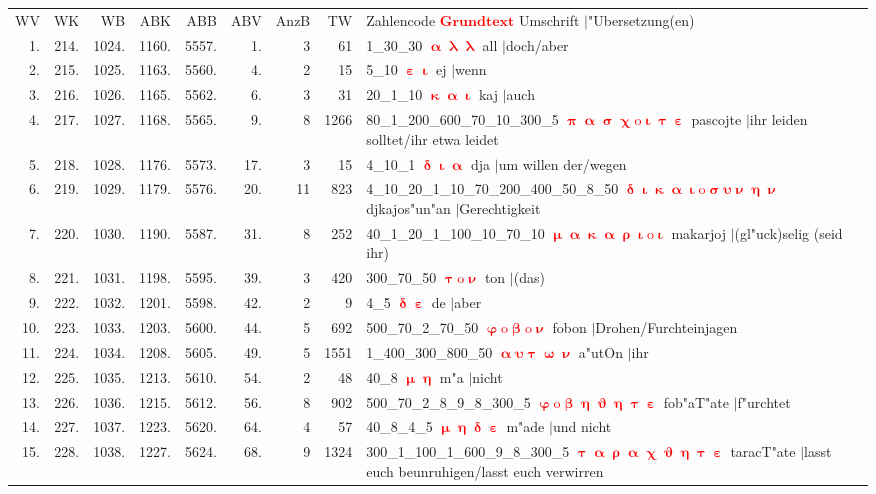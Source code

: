 \documentclass[a4paper,10pt,landscape]{article}
\begin{document}
\begin{tabular}{rrrrrrrrp{120mm}}
WV&WK&WB&ABK&ABB&ABV&AnzB&TW&Zahlencode \textcolor{red}{$\boldsymbol{Grundtext}$} Umschrift $|$"Ubersetzung(en)\\
1.&214.&1024.&1160.&5557.&1.&3&61&1\_30\_30 \textcolor{red}{$\boldsymbol{\upalpha\uplambda\uplambda}$} all $|$doch/aber\\
2.&215.&1025.&1163.&5560.&4.&2&15&5\_10 \textcolor{red}{$\boldsymbol{\upepsilon\upiota}$} ej $|$wenn\\
3.&216.&1026.&1165.&5562.&6.&3&31&20\_1\_10 \textcolor{red}{$\boldsymbol{\upkappa\upalpha\upiota}$} kaj $|$auch\\
4.&217.&1027.&1168.&5565.&9.&8&1266&80\_1\_200\_600\_70\_10\_300\_5 \textcolor{red}{$\boldsymbol{\uppi\upalpha\upsigma\upchi\mathrm{o}\upiota\uptau\upepsilon}$} pascojte $|$ihr leiden solltet/ihr etwa leidet\\
5.&218.&1028.&1176.&5573.&17.&3&15&4\_10\_1 \textcolor{red}{$\boldsymbol{\updelta\upiota\upalpha}$} dja $|$um willen der/wegen\\
6.&219.&1029.&1179.&5576.&20.&11&823&4\_10\_20\_1\_10\_70\_200\_400\_50\_8\_50 \textcolor{red}{$\boldsymbol{\updelta\upiota\upkappa\upalpha\upiota\mathrm{o}\upsigma\upsilon\upnu\upeta\upnu}$} djkajos"un"an $|$Gerechtigkeit\\
7.&220.&1030.&1190.&5587.&31.&8&252&40\_1\_20\_1\_100\_10\_70\_10 \textcolor{red}{$\boldsymbol{\upmu\upalpha\upkappa\upalpha\uprho\upiota\mathrm{o}\upiota}$} makarjoj $|$(gl"uck)selig (seid ihr)\\
8.&221.&1031.&1198.&5595.&39.&3&420&300\_70\_50 \textcolor{red}{$\boldsymbol{\uptau\mathrm{o}\upnu}$} ton $|$(das)\\
9.&222.&1032.&1201.&5598.&42.&2&9&4\_5 \textcolor{red}{$\boldsymbol{\updelta\upepsilon}$} de $|$aber\\
10.&223.&1033.&1203.&5600.&44.&5&692&500\_70\_2\_70\_50 \textcolor{red}{$\boldsymbol{\upvarphi\mathrm{o}\upbeta\mathrm{o}\upnu}$} fobon $|$Drohen/Furchteinjagen\\
11.&224.&1034.&1208.&5605.&49.&5&1551&1\_400\_300\_800\_50 \textcolor{red}{$\boldsymbol{\upalpha\upsilon\uptau\upomega\upnu}$} a"utOn $|$ihr\\
12.&225.&1035.&1213.&5610.&54.&2&48&40\_8 \textcolor{red}{$\boldsymbol{\upmu\upeta}$} m"a $|$nicht\\
13.&226.&1036.&1215.&5612.&56.&8&902&500\_70\_2\_8\_9\_8\_300\_5 \textcolor{red}{$\boldsymbol{\upvarphi\mathrm{o}\upbeta\upeta\upvartheta\upeta\uptau\upepsilon}$} fob"aT"ate $|$f"urchtet\\
14.&227.&1037.&1223.&5620.&64.&4&57&40\_8\_4\_5 \textcolor{red}{$\boldsymbol{\upmu\upeta\updelta\upepsilon}$} m"ade $|$und nicht\\
15.&228.&1038.&1227.&5624.&68.&9&1324&300\_1\_100\_1\_600\_9\_8\_300\_5 \textcolor{red}{$\boldsymbol{\uptau\upalpha\uprho\upalpha\upchi\upvartheta\upeta\uptau\upepsilon}$} taracT"ate $|$lasst euch beunruhigen/lasst euch verwirren\\
\end{tabular}\medskip \\
\end{document}

